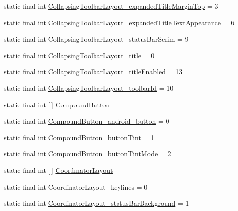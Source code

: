 \begin{DoxyCompactItemize}
\item 
static final int \hyperlink{classproject4_1_1xaria_1_1R_1_1styleable_acac04a3f2f5421067c31e2d58d3df10d}{Collapsing\+Toolbar\+Layout\+\_\+expanded\+Title\+Margin\+Top} = 3
\item 
static final int \hyperlink{classproject4_1_1xaria_1_1R_1_1styleable_ac2f467b39d5a7471793b18c31578d5a8}{Collapsing\+Toolbar\+Layout\+\_\+expanded\+Title\+Text\+Appearance} = 6
\item 
static final int \hyperlink{classproject4_1_1xaria_1_1R_1_1styleable_ab62e197d13af2c0b8dee73ebe8c76191}{Collapsing\+Toolbar\+Layout\+\_\+status\+Bar\+Scrim} = 9
\item 
static final int \hyperlink{classproject4_1_1xaria_1_1R_1_1styleable_a16736e7389574011ed56270a9c883976}{Collapsing\+Toolbar\+Layout\+\_\+title} = 0
\item 
static final int \hyperlink{classproject4_1_1xaria_1_1R_1_1styleable_a936dff2d19d66a8cbd916542670a8ce1}{Collapsing\+Toolbar\+Layout\+\_\+title\+Enabled} = 13
\item 
static final int \hyperlink{classproject4_1_1xaria_1_1R_1_1styleable_a0a1865ab13f923df3c8b09029e0f7e01}{Collapsing\+Toolbar\+Layout\+\_\+toolbar\+Id} = 10
\item 
static final int \mbox{[}$\,$\mbox{]} \hyperlink{classproject4_1_1xaria_1_1R_1_1styleable_a1f5b5d01ec9bc3843c12d8e55c052342}{Compound\+Button}
\item 
static final int \hyperlink{classproject4_1_1xaria_1_1R_1_1styleable_ab9acf4ab65ae29d7295148e85f0d4d06}{Compound\+Button\+\_\+android\+\_\+button} = 0
\item 
static final int \hyperlink{classproject4_1_1xaria_1_1R_1_1styleable_a2267569338e26b9552f290f79da5b8b0}{Compound\+Button\+\_\+button\+Tint} = 1
\item 
static final int \hyperlink{classproject4_1_1xaria_1_1R_1_1styleable_abfde535b5a5d50cc904acf3e419894fb}{Compound\+Button\+\_\+button\+Tint\+Mode} = 2
\item 
static final int \mbox{[}$\,$\mbox{]} \hyperlink{classproject4_1_1xaria_1_1R_1_1styleable_abe1865e41984c448731db5ef335746e0}{Coordinator\+Layout}
\item 
static final int \hyperlink{classproject4_1_1xaria_1_1R_1_1styleable_ab963e2c454e0f5352140c6bb4342351c}{Coordinator\+Layout\+\_\+keylines} = 0
\item 
static final int \hyperlink{classproject4_1_1xaria_1_1R_1_1styleable_a844b169229d25fbc371d4d62c12462f8}{Coordinator\+Layout\+\_\+status\+Bar\+Background} = 1

\end{DoxyCompactItemize}
